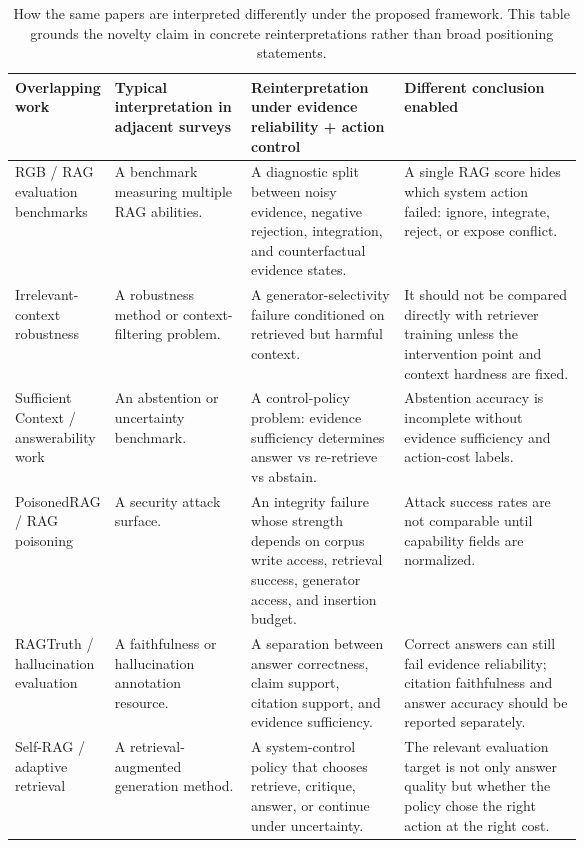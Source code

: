 \begin{table}[t]
\centering
\scriptsize
\renewcommand{\arraystretch}{0.9}
\begin{tabularx}{\linewidth}{>{\raggedright\arraybackslash}p{0.15\linewidth}>{\raggedright\arraybackslash}p{0.24\linewidth}>{\raggedright\arraybackslash}p{0.27\linewidth}X}
\toprule
\textbf{Overlapping work} & \textbf{Typical interpretation in adjacent surveys} & \textbf{Reinterpretation under evidence reliability + action control} & \textbf{Different conclusion enabled} \\
\midrule
RGB / RAG evaluation benchmarks & A benchmark measuring multiple RAG abilities. & A diagnostic split between noisy evidence, negative rejection, integration, and counterfactual evidence states. & A single RAG score hides which system action failed: ignore, integrate, reject, or expose conflict. \\
Irrelevant-context robustness & A robustness method or context-filtering problem. & A generator-selectivity failure conditioned on retrieved but harmful context. & It should not be compared directly with retriever training unless the intervention point and context hardness are fixed. \\
Sufficient Context / answerability work & An abstention or uncertainty benchmark. & A control-policy problem: evidence sufficiency determines answer vs re-retrieve vs abstain. & Abstention accuracy is incomplete without evidence sufficiency and action-cost labels. \\
PoisonedRAG / RAG poisoning & A security attack surface. & An integrity failure whose strength depends on corpus write access, retrieval success, generator access, and insertion budget. & Attack success rates are not comparable until capability fields are normalized. \\
RAGTruth / hallucination evaluation & A faithfulness or hallucination annotation resource. & A separation between answer correctness, claim support, citation support, and evidence sufficiency. & Correct answers can still fail evidence reliability; citation faithfulness and answer accuracy should be reported separately. \\
Self-RAG / adaptive retrieval & A retrieval-augmented generation method. & A system-control policy that chooses retrieve, critique, answer, or continue under uncertainty. & The relevant evaluation target is not only answer quality but whether the policy chose the right action at the right cost. \\
\bottomrule
\end{tabularx}
\caption{How the same papers are interpreted differently under the proposed framework. This table grounds the novelty claim in concrete reinterpretations rather than broad positioning statements.}
\label{tab:overlap-reinterpretation}
\end{table}

